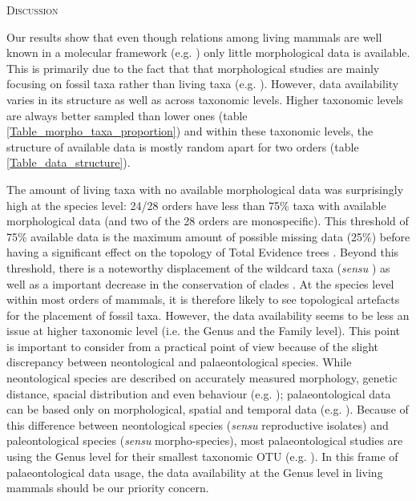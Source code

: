 \documentclass[12pt,letterpaper]{article}
\renewcommand{\section}[1]{%
\bigskip
\begin{center}
\begin{Large}
\normalfont\scshape #1
\medskip
\end{Large}
\end{center}}
\renewcommand{\subsection}[1]{%
\bigskip
\begin{center}
\begin{large}
\normalfont\itshape #1
\end{large}
\end{center}}
\begin{document}


%
%

\section{Discussion}
Our results show that even though relations among living mammals are well known in a molecular framework (e.g. \cite{FritzTree,meredithimpacts2011,May-Collado-PeerJ}) only little morphological data is available. This is primarily due to the fact that that morphological studies are mainly focusing on fossil taxa rather than living taxa (e.g. \cite{O'Leary08022013,ni2013oldest}). However, data availability varies in its structure as well as across taxonomic levels. Higher taxonomic levels are always better sampled than lower ones (table \ref{Table_morpho_taxa_proportion}) and within these taxonomic levels, the structure of available data is mostly random apart for two orders (table \ref{Table_data_structure}).

The amount of living taxa with no available morphological data was surprisingly high at the species level: 24/28 orders have less than 75\% taxa with available morphological data (and two of the 28 orders are monospecific). This threshold of 75\% available data is the maximum amount of possible missing data (25\%) before having a significant effect on the topology of Total Evidence trees \cite{GuillermeCooper}. Beyond this threshold, there is a noteworthy displacement of the wildcard taxa (\textit{sensu} \cite{kearneyfragmentary2002}) as well as a important decrease in the conservation of clades \cite{GuillermeCooper}. At the species level within most orders of mammals, it is therefore likely to see topological artefacts for the placement of fossil taxa. However, the data availability seems to be less an issue at higher taxonomic level (i.e. the Genus and the Family level). This point is important to consider from a practical point of view because of the slight discrepancy between neontological and palaeontological species. While neontological species are described on accurately measured morphology, genetic distance, spacial distribution and even behaviour (e.g. \cite{kellymolecular2014}); palaeontological data can be based only on morphological, spatial and temporal data (e.g. \cite{ni2013oldest}). Because of this difference between neontological species (\textit{sensu} reproductive isolates) and paleontological species (\textit{sensu} morpho-species), most palaeontological studies are using the Genus level for their smallest taxonomic OTU (e.g. \cite{ni2013oldest,O'Leary08022013}). In this frame of palaeontological data usage, the data availability at the Genus level in living mammals should be our priority concern.
\end{document}
